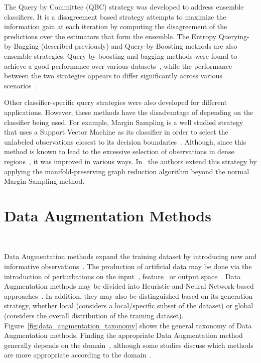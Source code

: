 \documentclass[parskip=full]{scrartcl}
\begin{document}
The Query by Committee (QBC) strategy was developed to address ensemble
classifiers. It is a disagreement based strategy attempts to maximize the
information gain at each iteration by computing the disagreement of the
predictions over the estimators that form the ensemble. The Entropy
Querying-by-Bagging (described previously) and Query-by-Boosting methods are
also ensemble strategies. Query by boosting and bagging methods were found to
achieve a good performance over various datasets~\cite{Melville2004}, while
the performance between the two strategies appears to differ significantly
across various scenarios~\cite{Bloodgood2018}.

Other classifier-specific query strategies were also developed for different
applications. However, these methods have the disadvantage of depending on the
classifier being used. For example, Margin Sampling is a well studied strategy
that uses a Support Vector Machine as its classifier in order to select the
unlabeled observations closest to its decision boundaries~\cite{Kumar2020}.
Although, since this method is known to lead to the excessive selection of
observations in dense regions~\cite{Zhou2014}, it was improved in various
ways. In~\cite{Zhou2014} the authors extend this strategy by applying the
manifold-preserving graph reduction algorithm beyond the normal Margin
Sampling method.

\section{Data Augmentation Methods}~\label{sec:data_augmentation}

Data Augmentation methods expand the training dataset by introducing new and
informative observations~\cite{Behpour2019}. The production of artificial data
may be done via the introduction of perturbations on the
input~\cite{Zhong2020}, feature~\cite{DeVries2017} or output
space~\cite{Behpour2019}. Data Augmentation methods may be divided into
Heuristic and Neural Network-based approaches~\cite{Shorten2019}. In addition,
they may also be distinguished based on its generation strategy, whether local
(considers a local/specific subset of the dataset) or global (considers the
overall distribution of the training dataset).
Figure~\ref{fig:data_augmentation_taxonomy} shows the general taxonomy of Data
Augmentation methods. Finding the appropriate Data Augmentation method
generally depends on the domain~\cite{DeVries2017}, although some studies
discuss which methods are more appropriate according to the
domain~\cite{Shorten2019, Iwana2021, Wong2016}.
\end{document}

